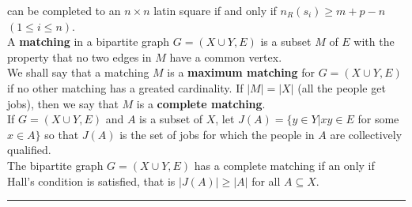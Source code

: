 \documentclass[10pt,landscape]{article}
\begin{document}
\begin{multicols}{4}
can be completed to an $n \times n$ latin square if and only if
$n_{R}(s_{i}) \geq m + p - n$ $(1 \leq i \leq n)$.\\
A \textbf{matching} in a bipartite graph $G = (X \cup Y, E)$ is a
subset $M$ of $E$ with the property that no two edges in $M$ have a
common vertex.\\
We shall say that a matching $M$ is a \textbf{maximum matching} for $G
=(X \cup Y,E)$ if no other matching has a greated cardinality. If $|M|
= |X|$ (all the people get jobs), then we say that $M$ is a
\textbf{complete matching}.\\
If $G = (X \cup Y, E)$ and $A$ is a subset of $X$, let $J(A) = \{y \in
Y | xy \in E$ for some $x \in A\}$ so that $J(A)$ is the set of jobs
for which the people in $A$ are collectively qualified.\\
The bipartite graph $G = (X \cup Y, E)$ has a complete matching if an
only if Hall's condition is satisfied, that is $|J(A)| \geq |A|$ for
all $A \subseteq X$.\\ 




\rule{0.3\linewidth}{0.25pt}
\scriptsize


\end{multicols}
\end{document}
